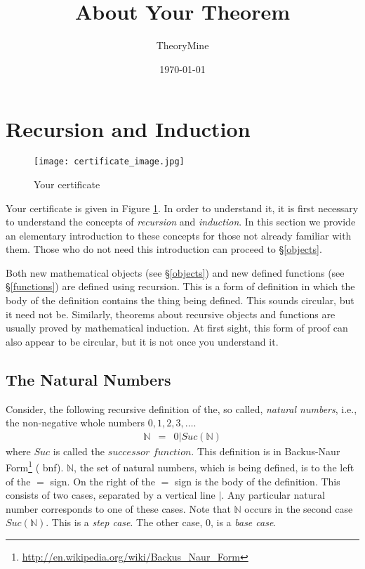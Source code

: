 \documentclass[twocolumn]{article}
\title{About Your Theorem}
\author{TheoryMine}
\date{\today}
\newcommand{\nat}{\mathbb{N}}
\begin{document}
\maketitle

\section{Recursion and Induction}
\label{recursion}



\begin{figure}[hbt]
\begin{center}
\texttt{[image: certificate\_image.jpg]}
\end{center}
\caption{Your certificate}
\label{certificate}
\end{figure}

Your certificate is given in Figure \ref{certificate}.  In order to understand
it, it is first necessary to understand the concepts of {\em recursion} and {\em
  induction}.  In this section we provide an elementary introduction to these
concepts for those not already familiar with them.  Those who do not need this
introduction can proceed to \S\ref{objects}.

Both new mathematical objects (see \S\ref{objects}) and new defined functions
(see \S\ref{functions}) are defined using recursion. This is a form of
definition in which the body of the definition contains the thing being
defined. This sounds circular, but it need not be. Similarly, theorems about
recursive objects and functions are usually proved by mathematical induction. At
first sight, this form of proof can also appear to be circular, but it is not
once you understand it.

\subsection{The Natural Numbers}
\label{naturals}

Consider, the following recursive definition of the, so called, {\em natural
  numbers}, i.e., the non-negative whole numbers $0, 1, 2, 3, \ldots$.
\begin{eqnarray}
 \nat & = & 0 |
Suc(\nat) \label{nats}
\end{eqnarray}
where $Suc$ is called the $successor$ $function$. This definition is in Backus-Naur
Form\footnote{\url{http://en.wikipedia.org/wiki/Backus_Naur_Form}} ({\sc
  bnf}). $\nat$, the set of natural numbers, which is being defined, is to the left
of the $=$ sign. On the right of the $=$ sign is the body of the
definition. This consists of two cases, separated by a vertical line $|$. Any
particular natural number corresponds to one of these cases.  Note that $\nat$
occurs in the second case $Suc(\nat)$. This is a {\em step case}. The other case,
$0$, is a {\em base case}. 
\end{document}
